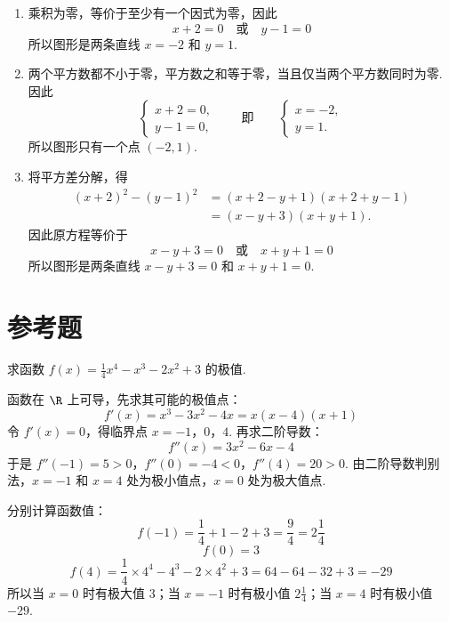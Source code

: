 \begin{solution}
\begin{enumerate}
\item 乘积为零，等价于至少有一个因式为零，因此
\[
x+2=0\quad\text{或}\quad y-1=0
\]
所以图形是两条直线 \(x=-2\) 和 \(y=1\).


\item 两个平方数都不小于零，平方数之和等于零，当且仅当两个平方数同时为零. 因此
\[
\begin{cases}
x+2=0,\\
y-1=0,
\end{cases}
\qquad\text{即}\qquad
\begin{cases}
x=-2,\\
y=1.
\end{cases}
\]
所以图形只有一个点 \((-2,1)\).


\item 将平方差分解，得
\[
\begin{aligned}
\left(x+2\right)^2-\left(y-1\right)^2
&=\left(x+2-y+1\right)\left(x+2+y-1\right)\\
&=\left(x-y+3\right)\left(x+y+1\right).
\end{aligned}
\]
因此原方程等价于
\[
x-y+3=0\quad\text{或}\quad x+y+1=0
\]
所以图形是两条直线 \(x-y+3=0\) 和 \(x+y+1=0\).

\end{enumerate}
\end{solution}

\section{参考题}

\begin{problem}
求函数 \(f(x)=\frac{1}{4}x^4-x^3-2x^2+3\) 的极值.
\end{problem}

\begin{solution}
函数在 \(\R\) 上可导，先求其可能的极值点：
\[
f'(x)=x^3-3x^2-4x=x(x-4)(x+1)
\]
令 \(f'(x)=0\)，得临界点 \(x=-1\)，\(0\)，\(4\). 再求二阶导数：
\[
f''(x)=3x^2-6x-4
\]
于是
\(f''(-1)=5>0\)，\(f''(0)=-4<0\)，\(f''(4)=20>0\).
由二阶导数判别法，\(x=-1\) 和 \(x=4\) 处为极小值点，\(x=0\) 处为极大值点.

分别计算函数值：
\[
f(-1)=\frac14+1-2+3=\frac94=2\frac14
\]
\[
f(0)=3
\]
\[
f(4)=\frac14\times4^4-4^3-2\times4^2+3=64-64-32+3=-29
\]
所以当 \(x=0\) 时有极大值 \(3\)；当 \(x=-1\) 时有极小值 \(2\frac14\)；当 \(x=4\) 时有极小值 \(-29\).
\end{solution}

